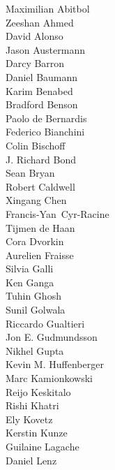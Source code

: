 \documentclass[PICOReport.tex]{subfiles}
\begin{document}
\footnotesize {
\begin{multicols}{4}
Maximilian Abitbol              \\
Zeeshan Ahmed                   \\
David Alonso                    \\
Jason Austermann                \\
Darcy Barron                    \\
Daniel Baumann                  \\
Karim Benabed                   \\
Bradford Benson                 \\
Paolo de Bernardis              \\
Federico Bianchini              \\
Colin Bischoff                  \\
J. Richard Bond                 \\
Sean Bryan                      \\
Robert Caldwell                 \\
Xingang Chen                    \\
Francis-Yan~Cyr-Racine          \\
Tijmen de Haan                  \\
Cora Dvorkin                    \\
Aurelien Fraisse                \\
Silvia Galli                    \\
Ken Ganga                       \\
Tuhin Ghosh                     \\
Sunil Golwala                   \\
Riccardo Gualtieri              \\
Jon E. Gudmundsson              \\
Nikhel Gupta                    \\
Kevin M. Huffenberger           \\
Marc Kamionkowski               \\
Reijo Keskitalo                 \\
Rishi Khatri                    \\
Ely Kovetz                      \\
Kerstin Kunze                   \\
Guilaine Lagache                \\
Daniel Lenz                     \\

\end{multicols}}
\end{document}
